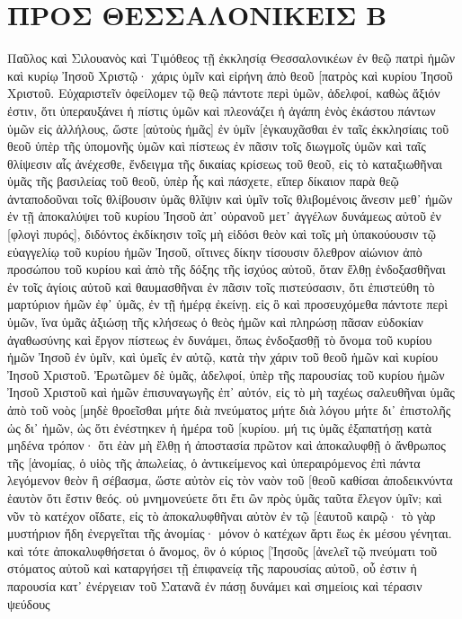 \section{ΠΡΟΣ ΘΕΣΣΑΛΟΝΙΚΕΙΣ Β}
Παῦλος καὶ Σιλουανὸς καὶ Τιμόθεος τῇ ἐκκλησίᾳ Θεσσαλονικέων ἐν θεῷ πατρὶ ἡμῶν καὶ κυρίῳ Ἰησοῦ Χριστῷ· 
χάρις ὑμῖν καὶ εἰρήνη ἀπὸ θεοῦ [πατρὸς καὶ κυρίου Ἰησοῦ Χριστοῦ. 
Εὐχαριστεῖν ὀφείλομεν τῷ θεῷ πάντοτε περὶ ὑμῶν, ἀδελφοί, καθὼς ἄξιόν ἐστιν, ὅτι ὑπεραυξάνει ἡ πίστις ὑμῶν καὶ πλεονάζει ἡ ἀγάπη ἑνὸς ἑκάστου πάντων ὑμῶν εἰς ἀλλήλους, 
ὥστε [αὐτοὺς ἡμᾶς] ἐν ὑμῖν [ἐγκαυχᾶσθαι ἐν ταῖς ἐκκλησίαις τοῦ θεοῦ ὑπὲρ τῆς ὑπομονῆς ὑμῶν καὶ πίστεως ἐν πᾶσιν τοῖς διωγμοῖς ὑμῶν καὶ ταῖς θλίψεσιν αἷς ἀνέχεσθε, 
ἔνδειγμα τῆς δικαίας κρίσεως τοῦ θεοῦ, εἰς τὸ καταξιωθῆναι ὑμᾶς τῆς βασιλείας τοῦ θεοῦ, ὑπὲρ ἧς καὶ πάσχετε, 
εἴπερ δίκαιον παρὰ θεῷ ἀνταποδοῦναι τοῖς θλίβουσιν ὑμᾶς θλῖψιν 
καὶ ὑμῖν τοῖς θλιβομένοις ἄνεσιν μεθ᾽ ἡμῶν ἐν τῇ ἀποκαλύψει τοῦ κυρίου Ἰησοῦ ἀπ᾽ οὐρανοῦ μετ᾽ ἀγγέλων δυνάμεως αὐτοῦ 
ἐν [φλογὶ πυρός], διδόντος ἐκδίκησιν τοῖς μὴ εἰδόσι θεὸν καὶ τοῖς μὴ ὑπακούουσιν τῷ εὐαγγελίῳ τοῦ κυρίου ἡμῶν Ἰησοῦ, 
οἵτινες δίκην τίσουσιν ὄλεθρον αἰώνιον ἀπὸ προσώπου τοῦ κυρίου καὶ ἀπὸ τῆς δόξης τῆς ἰσχύος αὐτοῦ, 
ὅταν ἔλθῃ ἐνδοξασθῆναι ἐν τοῖς ἁγίοις αὐτοῦ καὶ θαυμασθῆναι ἐν πᾶσιν τοῖς πιστεύσασιν, ὅτι ἐπιστεύθη τὸ μαρτύριον ἡμῶν ἐφ᾽ ὑμᾶς, ἐν τῇ ἡμέρᾳ ἐκείνῃ. 
εἰς ὃ καὶ προσευχόμεθα πάντοτε περὶ ὑμῶν, ἵνα ὑμᾶς ἀξιώσῃ τῆς κλήσεως ὁ θεὸς ἡμῶν καὶ πληρώσῃ πᾶσαν εὐδοκίαν ἀγαθωσύνης καὶ ἔργον πίστεως ἐν δυνάμει, 
ὅπως ἐνδοξασθῇ τὸ ὄνομα τοῦ κυρίου ἡμῶν Ἰησοῦ ἐν ὑμῖν, καὶ ὑμεῖς ἐν αὐτῷ, κατὰ τὴν χάριν τοῦ θεοῦ ἡμῶν καὶ κυρίου Ἰησοῦ Χριστοῦ. 
Ἐρωτῶμεν δὲ ὑμᾶς, ἀδελφοί, ὑπὲρ τῆς παρουσίας τοῦ κυρίου ἡμῶν Ἰησοῦ Χριστοῦ καὶ ἡμῶν ἐπισυναγωγῆς ἐπ᾽ αὐτόν, 
εἰς τὸ μὴ ταχέως σαλευθῆναι ὑμᾶς ἀπὸ τοῦ νοὸς [μηδὲ θροεῖσθαι μήτε διὰ πνεύματος μήτε διὰ λόγου μήτε δι᾽ ἐπιστολῆς ὡς δι᾽ ἡμῶν, ὡς ὅτι ἐνέστηκεν ἡ ἡμέρα τοῦ [κυρίου. 
μή τις ὑμᾶς ἐξαπατήσῃ κατὰ μηδένα τρόπον· ὅτι ἐὰν μὴ ἔλθῃ ἡ ἀποστασία πρῶτον καὶ ἀποκαλυφθῇ ὁ ἄνθρωπος τῆς [ἀνομίας, ὁ υἱὸς τῆς ἀπωλείας, 
ὁ ἀντικείμενος καὶ ὑπεραιρόμενος ἐπὶ πάντα λεγόμενον θεὸν ἢ σέβασμα, ὥστε αὐτὸν εἰς τὸν ναὸν τοῦ [θεοῦ καθίσαι ἀποδεικνύντα ἑαυτὸν ὅτι ἔστιν θεός. 
οὐ μνημονεύετε ὅτι ἔτι ὢν πρὸς ὑμᾶς ταῦτα ἔλεγον ὑμῖν; 
καὶ νῦν τὸ κατέχον οἴδατε, εἰς τὸ ἀποκαλυφθῆναι αὐτὸν ἐν τῷ [ἑαυτοῦ καιρῷ· 
τὸ γὰρ μυστήριον ἤδη ἐνεργεῖται τῆς ἀνομίας· μόνον ὁ κατέχων ἄρτι ἕως ἐκ μέσου γένηται. 
καὶ τότε ἀποκαλυφθήσεται ὁ ἄνομος, ὃν ὁ κύριος [Ἰησοῦς [ἀνελεῖ τῷ πνεύματι τοῦ στόματος αὐτοῦ καὶ καταργήσει τῇ ἐπιφανείᾳ τῆς παρουσίας αὐτοῦ, 
οὗ ἐστιν ἡ παρουσία κατ᾽ ἐνέργειαν τοῦ Σατανᾶ ἐν πάσῃ δυνάμει καὶ σημείοις καὶ τέρασιν ψεύδους 
